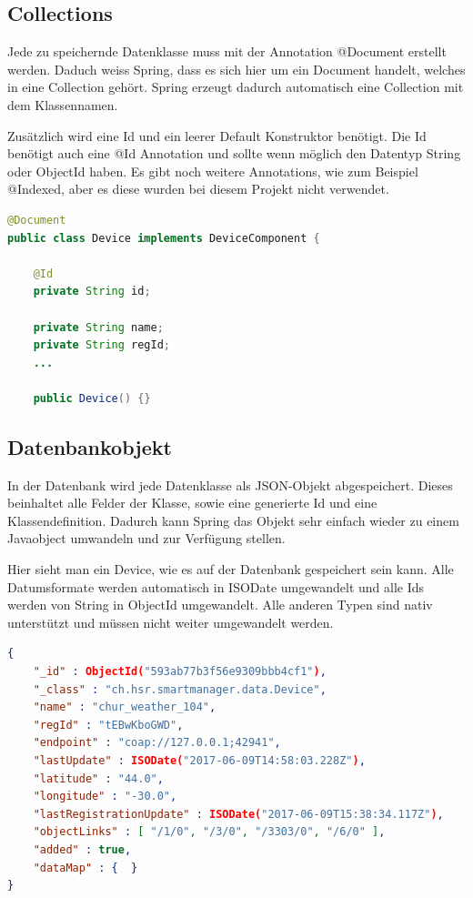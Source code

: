\subsection{Collections}
Jede zu speichernde Datenklasse muss mit der Annotation @Document erstellt werden. Daduch weiss Spring, dass es sich hier um ein Document handelt, welches in eine Collection gehört. Spring erzeugt dadurch automatisch eine Collection mit dem Klassennamen.

Zusätzlich wird eine Id und ein leerer Default Konstruktor benötigt. Die Id benötigt auch eine @Id Annotation und sollte wenn möglich den Datentyp String oder ObjectId haben. Es gibt noch weitere Annotations, wie zum Beispiel @Indexed, aber es diese wurden bei diesem Projekt nicht verwendet. 
\begin{lstlisting}[language=java]
@Document
public class Device implements DeviceComponent {

	@Id
	private String id;

	private String name;
	private String regId;
	...
	
	public Device() {}
\end{lstlisting}
\newpage

\subsection{Datenbankobjekt}
In der Datenbank wird jede Datenklasse als JSON-Objekt abgespeichert. Dieses beinhaltet alle Felder der Klasse, sowie eine generierte Id und eine Klassendefinition. Dadurch kann Spring das Objekt sehr einfach wieder zu einem Javaobject umwandeln und zur Verfügung stellen.

Hier sieht man ein Device, wie es auf der Datenbank gespeichert sein kann. Alle Datumsformate werden automatisch in ISODate umgewandelt und alle Ids werden von String in ObjectId umgewandelt. Alle anderen Typen sind nativ unterstützt und müssen nicht weiter umgewandelt werden.
\begin{lstlisting}[language=json]
{ 
	"_id" : ObjectId("593ab77b3f56e9309bbb4cf1"), 
	"_class" : "ch.hsr.smartmanager.data.Device", 
	"name" : "chur_weather_104", 
	"regId" : "tEBwKboGWD", 
	"endpoint" : "coap://127.0.0.1;42941", 
	"lastUpdate" : ISODate("2017-06-09T14:58:03.228Z"), 
	"latitude" : "44.0", 
	"longitude" : "-30.0", 
	"lastRegistrationUpdate" : ISODate("2017-06-09T15:38:34.117Z"),
	"objectLinks" : [ "/1/0", "/3/0", "/3303/0", "/6/0" ], 
	"added" : true, 
	"dataMap" : {  } 
}
\end{lstlisting}

